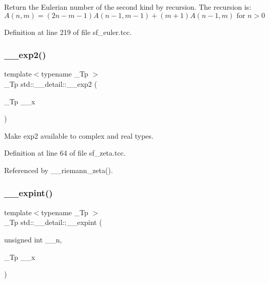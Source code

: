 Return the Eulerian number of the second kind by recursion. The recursion is\+: \[ A(n,m) = (2n-m-1)A(n-1,m-1) + (m+1)A(n-1,m) \mbox{ for } n > 0 \] 

Definition at line 219 of file sf\+\_\+euler.\+tcc.

\mbox{\label{namespacestd_1_1____detail_a51c70764063ef329a4ab96f837c99faf}} 
\subsubsection{\texorpdfstring{\+\_\+\+\_\+exp2()}{\_\_exp2()}}
{\footnotesize\ttfamily template$<$typename \+\_\+\+Tp $>$ \\
\+\_\+\+Tp std\+::\+\_\+\+\_\+detail\+::\+\_\+\+\_\+exp2 (\begin{DoxyParamCaption}\item[{\+\_\+\+Tp}]{\+\_\+\+\_\+x }\end{DoxyParamCaption})}

Make exp2 available to complex and real types. 

Definition at line 64 of file sf\+\_\+zeta.\+tcc.



Referenced by \+\_\+\+\_\+riemann\+\_\+zeta().

\mbox{\label{namespacestd_1_1____detail_a0282700710ec07b8ca095fe2ec140d6e}} 
\subsubsection{\texorpdfstring{\+\_\+\+\_\+expint()}{\_\_expint()}\hspace{0.1cm}{\footnotesize\ttfamily [1/2]}}
{\footnotesize\ttfamily template$<$typename \+\_\+\+Tp $>$ \\
\+\_\+\+Tp std\+::\+\_\+\+\_\+detail\+::\+\_\+\+\_\+expint (\begin{DoxyParamCaption}\item[{unsigned int}]{\+\_\+\+\_\+n,  }\item[{\+\_\+\+Tp}]{\+\_\+\+\_\+x }\end{DoxyParamCaption})}



